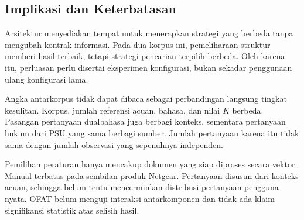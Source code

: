 \subsection{Implikasi dan Keterbatasan}
Arsitektur  menyediakan tempat untuk menerapkan strategi yang berbeda tanpa mengubah kontrak informasi. Pada dua korpus ini, pemeliharaan struktur memberi hasil  terbaik, tetapi strategi pencarian terpilih berbeda. Oleh karena itu, perluasan  perlu disertai eksperimen konfigurasi, bukan sekadar penggunaan ulang konfigurasi lama.

Angka antarkorpus tidak dapat dibaca sebagai perbandingan langsung tingkat kesulitan. Korpus, jumlah referensi acuan, bahasa, dan nilai $K$ berbeda. Pasangan pertanyaan dualbahasa juga berbagi konteks, sementara pertanyaan hukum dari PSU yang sama berbagi sumber. Jumlah pertanyaan karena itu tidak sama dengan jumlah observasi yang sepenuhnya independen.

Pemilihan peraturan hanya mencakup dokumen yang siap diproses secara vektor. Manual terbatas pada sembilan produk Netgear. Pertanyaan disusun dari konteks acuan, sehingga belum tentu mencerminkan distribusi pertanyaan pengguna nyata. OFAT belum menguji interaksi antarkomponen dan tidak ada klaim signifikansi statistik atas selisih hasil.
